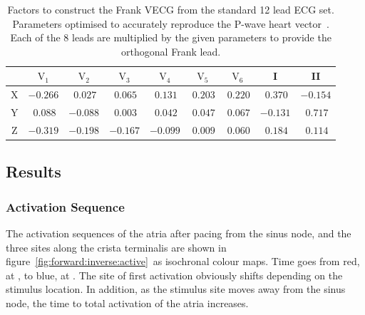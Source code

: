 \begin{table}
\caption[Inverse Dower Factors after Guillem et al.]{
\label{tbl:forward:idparams}
Factors to construct the Frank VECG from the standard 12 lead ECG set.
Parameters optimised to accurately reproduce the P-wave heart
vector~\cite{Guillem2008}.
Each of the 8 leads are multiplied by the given parameters to provide the
orthogonal Frank lead.
}
\begin{center}
\begin{tabular}{c c c c c c c c c}
\toprule
& $\text{V}_{\text{1}}$ &$\text{V}_{\text{2}}$ & $\text{V}_{\text{3}}$ &
$\text{V}_{\text{4}}$ & $\text{V}_{\text{5}}$ & $\text{V}_{\text{6}}$ & I & II \\
\midrule
X & $-0.266$ & $\:0.027$ &  $\:0.065$ & $\:0.131$ & $\:0.203$ & $\:0.220$ & $\:0.370$ & $-0.154$ \\
Y & $\:0.088$ &  $-0.088$ & $\:0.003$ & $\:0.042$ & $\:0.047$ & $\:0.067$ & $-0.131$ & $\:0.717$ \\
Z & $-0.319$ & $-0.198$ & $-0.167$ & $-0.099$ & $\:0.009$ & $\:0.060$ & $\:0.184$ & $\:0.114$ \\
\bottomrule
\end{tabular}
\end{center}
\end{table}

\subsection{Results}

\subsubsection{Activation Sequence}

The activation sequences of the atria after pacing from the sinus node, and the
three sites along the crista terminalis are shown in
figure~\ref{fig:forward:inverse:active}\ as isochronal colour maps.
Time goes from red, at , to blue, at .
The site of first activation obviously shifts depending on the stimulus
location.
In addition, as the stimulus site moves away from the sinus node, the time to
total activation of the atria increases.

